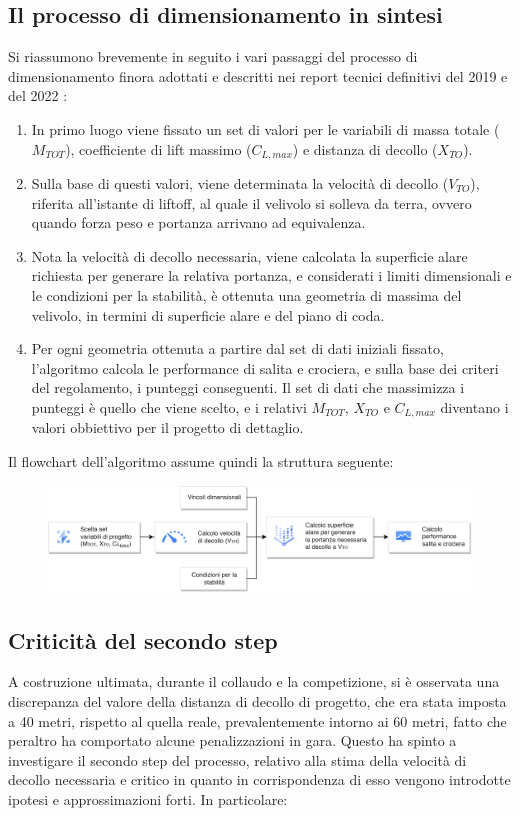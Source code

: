 \documentclass[12pt]{article}
\begin{document}
\subsection{Il processo di dimensionamento in sintesi}
Si riassumono brevemente in seguito i vari passaggi del processo di dimensionamento finora adottati e descritti nei report tecnici definitivi del 2019 \cite{report2019} e del 2022 \cite{report2022}:
\begin{enumerate}
\item In primo luogo viene fissato un set di valori per le variabili di massa totale ($M_{TOT}$), coefficiente di lift massimo ($C_{L, max}$) e distanza di decollo ($X_{TO}$). 
\item Sulla base di questi valori, viene determinata la velocità di decollo ($V_{TO}$), riferita all'istante di liftoff, al quale il velivolo si solleva da terra, ovvero quando forza peso e portanza arrivano ad equivalenza.
\item Nota la velocità di decollo necessaria, viene calcolata la superficie alare richiesta per generare la relativa portanza, e considerati i limiti dimensionali e le condizioni per la stabilità, è ottenuta una geometria di massima del velivolo, in termini di superficie alare e del piano di coda.
\item Per ogni geometria ottenuta a partire dal set di dati iniziali fissato, l'algoritmo calcola le performance di salita e crociera, e sulla base dei criteri del regolamento, i punteggi conseguenti. Il set di dati che massimizza i punteggi è quello che viene scelto, e i relativi $M_{TOT}$, $X_{TO}$ e $C_{L, max}$ diventano i valori obbiettivo per il progetto di dettaglio.
\end{enumerate}
Il flowchart dell'algoritmo assume quindi la struttura seguente:
\begin{figure}[h]
	\centering
	\includegraphics[width=14cm]{img/dimensionamento}
\end{figure}

\subsection{Criticità del secondo step}
A costruzione ultimata, durante il collaudo e la competizione, si è osservata una discrepanza del valore della distanza di decollo di progetto, che era stata imposta a 40 metri, rispetto al quella reale, prevalentemente intorno ai 60 metri, fatto che peraltro ha comportato alcune penalizzazioni in gara. Questo ha spinto a investigare il secondo step del processo, relativo alla stima della velocità di decollo necessaria e critico in quanto in corrispondenza di esso vengono introdotte ipotesi e approssimazioni forti. In particolare: 
\end{document}
